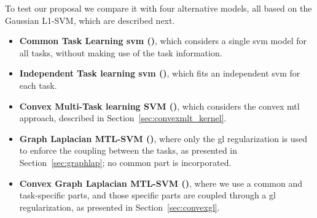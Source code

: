 To test our proposal we compare it with four alternative models, all based on the Gaussian L1-SVM, which are described next.
%
\begin{itemize}
    \item \textbf{Common Task Learning \acrshort{svm} ()}, which considers a single \acrshort{svm} model for all tasks, without making use of the task information.
    \item \textbf{Independent Task learning \acrshort{svm} ()}, which fits an independent \acrshort{svm} for each task.
    \item \textbf{Convex Multi-Task learning SVM ()}, which considers the convex \acrshort{mtl} approach, described in Section~\ref{sec:convexmlt_kernel}.
    \item \textbf{Graph Laplacian MTL-SVM ()}, where only the \acrshort{gl} regularization is used to enforce the coupling between the tasks, as presented in Section~\ref{sec:graphlap}; no common part is incorporated.
    \item \textbf{Convex Graph Laplacian MTL-SVM ()}, where we use a common and task-specific parts, and those specific parts are coupled through a \acrshort{gl} regularization, as presented in Section~\ref{sec:convexgl}.
\end{itemize}




